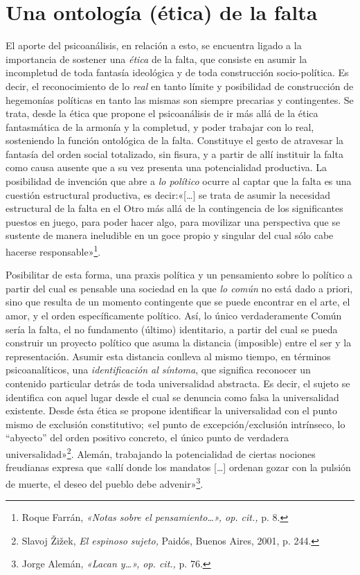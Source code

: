 \section{Una ontología (ética) de la falta}

El aporte del psicoanálisis, en relación a esto, se encuentra ligado a la importancia de sostener una \emph{ética} de la falta, que consiste en asumir la incompletud de toda fantasía ideológica y de toda construcción socio-política. Es decir, el reconocimiento de lo \emph{real} en tanto límite y posibilidad de construcción de hegemonías políticas en tanto las mismas son siempre precarias y contingentes. Se trata, desde la ética que propone el psicoanálisis de ir más allá de la ética fantasmática de la armonía y la completud, y poder trabajar con lo real, sosteniendo la función ontológica de la falta. Constituye el gesto de atravesar la fantasía del orden social totalizado, sin fisura, y a partir de allí instituir la falta como causa ausente que a su vez presenta una potencialidad productiva. La posibilidad de invención que abre a \emph{lo político} ocurre al captar que la falta es una cuestión estructural productiva, es decir:«{[}\ldots{]} se trata de asumir la necesidad estructural de la falta en el Otro más allá de la contingencia de los significantes puestos en juego, para poder hacer algo, para movilizar una perspectiva que se sustente de manera ineludible en un goce propio y singular del cual sólo cabe hacerse responsable»\footnote{Roque Farrán, \emph{«Notas sobre el pensamiento\ldots», op. cit.,} p. 8.}.

Posibilitar de esta forma, una praxis política y un pensamiento sobre lo político a partir del cual es pensable una sociedad en la que \emph{lo común} no está dado a priori, sino que resulta de un momento contingente que se puede encontrar en el arte, el amor, y el orden específicamente político. Así, lo único verdaderamente Común sería la falta, el no fundamento (último) identitario, a partir del cual se pueda construir un proyecto político que asuma la distancia (imposible) entre el ser y la representación. Asumir esta distancia conlleva al mismo tiempo, en términos psicoanalíticos, una \emph{identificación al síntoma}, que significa reconocer un contenido particular detrás de toda universalidad abstracta. Es decir, el sujeto se identifica con aquel lugar desde el cual se denuncia como falsa la universalidad existente. Desde ésta ética se propone identificar la universalidad con el punto mismo de exclusión constitutivo; «el punto de excepción/exclusión intrínseco, lo ``abyecto'' del orden positivo concreto, el único punto de verdadera universalidad»\footnote{Slavoj Žižek, \emph{El espinoso sujeto,} Paidós, Buenos Aires, 2001, p. 244.}. Alemán, trabajando la potencialidad de ciertas nociones freudianas expresa que «allí donde los mandatos {[}\ldots{]} ordenan gozar con la pulsión de muerte, el deseo del pueblo debe advenir»\footnote{Jorge Alemán, \emph{«Lacan y\ldots», op. cit.,} p. 76.}.

